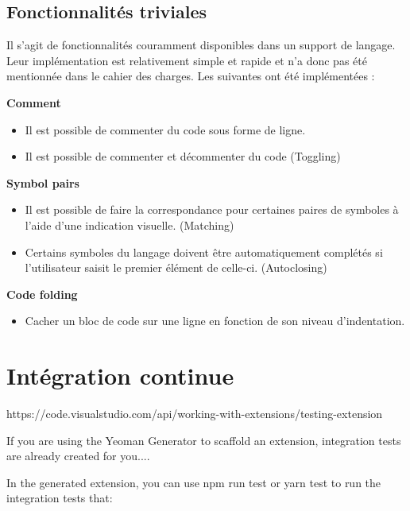\documentclass[
    iict, %
    il, %
]{heig-tb}
\begin{document}
\section{Fonctionnalités triviales}
Il s'agit de fonctionnalités couramment disponibles dans un support de langage. Leur implémentation est relativement simple et rapide et n'a donc pas été mentionnée dans le cahier des charges.
Les suivantes ont été implémentées :

\textbf{Comment}
\begin{itemize}
    \item Il est possible de commenter du code sous forme de ligne.
    \item Il est possible de commenter et décommenter du code (Toggling)
\end{itemize}

\textbf{Symbol pairs}
\begin{itemize}
    \item Il est possible de faire la correspondance pour certaines paires de symboles à l'aide d'une indication visuelle. (Matching)
    \item Certains symboles du langage doivent être automatiquement complétés si l'utilisateur saisit le premier élément de celle-ci. (Autoclosing)
\end{itemize}

\textbf{Code folding}
\begin{itemize}
    \item Cacher un bloc de code sur une ligne en fonction de son niveau d'indentation.
\end{itemize}


\chapter{Intégration continue}


https://code.visualstudio.com/api/working-with-extensions/testing-extension

If you are using the Yeoman Generator to scaffold an extension, integration tests are already created for you....

In the generated extension, you can use npm run test or yarn test to run the integration tests that:
\end{document}
